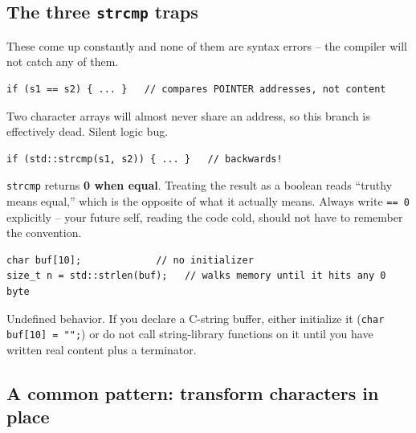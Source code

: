 \documentclass[11pt]{article}
\begin{document}
\subsection{The three \texttt{strcmp} traps}

These come up constantly and none of them are syntax errors -- the
compiler will not catch any of them.

\begin{warnbox}[1. Using \texttt{==} on C strings]
\begin{verbatim}
if (s1 == s2) { ... }   // compares POINTER addresses, not content
\end{verbatim}
Two character arrays will almost never share an address, so this
branch is effectively dead. Silent logic bug.
\end{warnbox}

\begin{warnbox}[2. Forgetting \texttt{== 0}]
\begin{verbatim}
if (std::strcmp(s1, s2)) { ... }   // backwards!
\end{verbatim}
\texttt{strcmp} returns \textbf{0 when equal}. Treating the result as a
boolean reads ``truthy means equal,'' which is the opposite of what it
actually means. Always write \texttt{== 0} explicitly -- your future
self, reading the code cold, should not have to remember the
convention.
\end{warnbox}

\begin{warnbox}
\begin{verbatim}
char buf[10];             // no initializer
size_t n = std::strlen(buf);   // walks memory until it hits any 0 byte
\end{verbatim}
Undefined behavior. If you declare a C-string buffer, either
initialize it (\texttt{char buf[10] = "";}) or do not call
string-library functions on it until you have written real content
plus a terminator.
\end{warnbox}

\subsection{A common pattern: transform characters in place}
\end{document}
